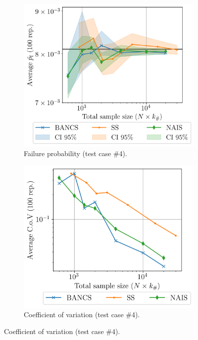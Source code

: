 \begin{figure}
\begin{subfigure}[b]{0.47\linewidth}
    \end{subfigure}
    \begin{subfigure}[b]{0.49\linewidth}
        \centering
        \includegraphics[width=\linewidth]{part3/figures/BANCS/RP38_mean.png}
        \caption{Failure probability (test case \#4).}
    \end{subfigure}
    \begin{subfigure}[b]{0.47\linewidth}
        \centering
        \includegraphics[width=\linewidth]{part3/figures/BANCS/RP38_cov.png}
        \caption{Coefficient of variation (test case \#4).}
    \end{subfigure}


\end{figure}
